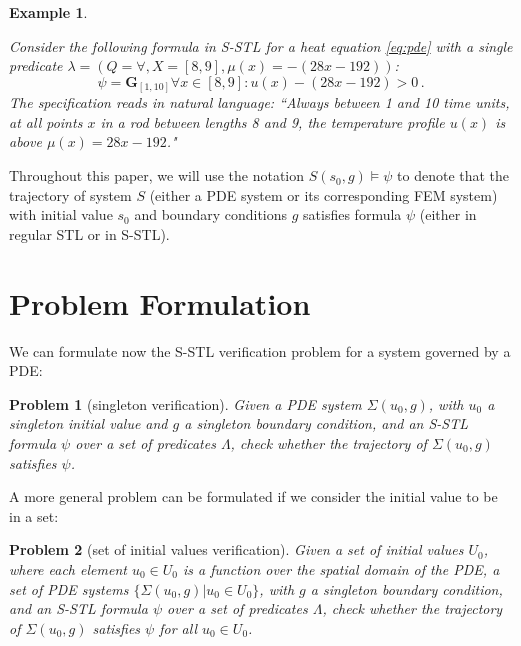 \documentclass[letterpaper, 10 pt, conference]{ieeeconf/ieeeconf}
\newtheorem{problem}{Problem}
\newtheorem{example}{Example}
\newcommand{\Always}{\mathbf{G}}
\begin{document}
\begin{example}
    \label{ex:stl}

    Consider the following formula in S-STL for a heat equation \cref{eq:pde} with a single predicate
    $\lambda = (Q = \forall, X = [8, 9], \mu(x) = -(28x - 192))$:
%
    \begin{equation}
        \psi = \Always_{[1,10]} \forall x \in [8,9] : u(x) - (28x - 192) > 0 \,.
    \end{equation}
%
    The specification reads in natural language: ``Always between 1 and 10 time
    units, at all points $x$ in a rod between lengths 8 and 9, the temperature
    profile $u(x)$ is above $\mu(x) = 28x - 192$."

\end{example}

Throughout this paper, we will use the notation $S(s_0, g) \models \psi$ to denote
that the trajectory of system $S$ (either a PDE system or its corresponding FEM
system) with initial value $s_0$ and boundary conditions $g$ satisfies formula 
$\psi$ (either in regular STL or in S-STL).

\section{Problem Formulation}
\label{sec:problem_formulation}

We can formulate now the S-STL verification problem for a system governed by a
PDE:

\begin{problem}[singleton verification]
\label{pr:stl}
    Given a PDE system $\Sigma(u_0, g)$, with $u_0$ a singleton initial value and $g$
    a singleton boundary condition, and an S-STL formula $\psi$ over a set of
    predicates $\Lambda$, check whether the trajectory of $\Sigma(u_0, g)$
    satisfies $\psi$.
\end{problem}

A more general problem can be formulated if we consider the initial value to be
in a set:

\begin{problem}[set of initial values verification]
\label{pr:stl_set}
    Given a set of initial values $U_0$, where each element $u_0 \in U_0$ is a
    function over the spatial domain of the PDE, a set of PDE systems
    $\{\Sigma(u_0, g) | u_0 \in U_0\}$, with $g$
    a singleton boundary condition, and an S-STL formula $\psi$ over a set of
    predicates $\Lambda$, check whether the trajectory of $\Sigma(u_0, g)$
    satisfies $\psi$ for all $u_0 \in U_0$.
\end{problem}
\end{document}
